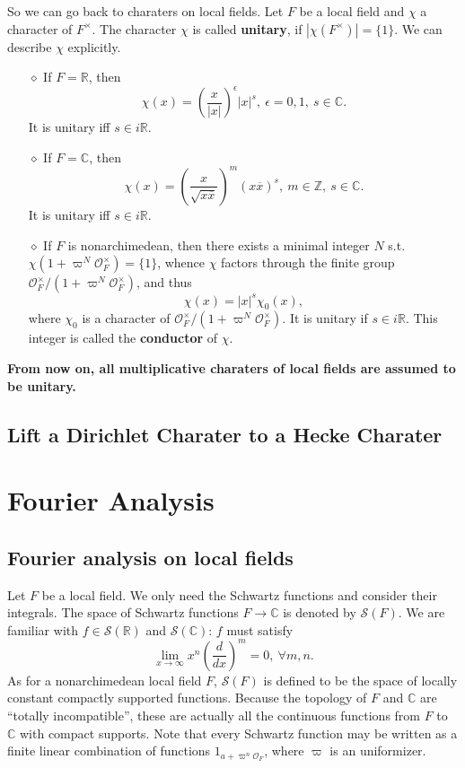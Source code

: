 \documentclass{article}
\theoremstyle{definition}
\theoremstyle{remark}
\renewcommand{\bar}{\overline}
\newcommand{\R}{\mathbb{R}}
\newcommand{\C}{\mathbb{C}}
\newcommand{\Z}{\mathbb{Z}}
\renewcommand{\O}{\mathcal{O}}
\newcommand{\myit}{$\diamond$}
\begin{document}
So we can go back to charaters on local fields. Let $F$ be a local field and $\chi$ a character of $F^{\times}$. The character $\chi$ is called \textbf{unitary}, if $|\chi(F^{\times})| = \{1\}$.
We can describe $\chi$ explicitly.
\begin{enumerate}
    \item [\myit] If $F = \R$, then \[\chi(x) = \left( \frac{x}{|x|} \right)^{\epsilon}|x|^s,\ \epsilon = 0, 1,\ s\in\C.\] It is unitary iff $s\in i\R$.
    \item [\myit] If $F = \C$, then \[\chi(x) = \left( \frac{x}{\sqrt{x\bar{x}}} \right)^m(x\bar{x})^s,\ m\in\Z,\ s\in\C.\] It is unitary iff $s\in i\R$.
    \item [\myit] If $F$ is nonarchimedean, then there exists a minimal integer $N$ s.t. $\chi(1 + \varpi^N\O_F^\times) = \{1\}$, whence $\chi$ factors through the finite group $\O_F^\times/(1 + \varpi^N\O_F^\times)$, and thus \[\chi(x) = |x|^s\chi_0(x),\] where $\chi_0$ is a character of $\O_F^\times/(1 + \varpi^N\O_F^\times)$.
    It is unitary if $s\in i\R$. 
    This integer is called the \textbf{conductor} of $\chi$. 
\end{enumerate}

\textbf{From now on, all multiplicative charaters of local fields are assumed to be unitary.}

\subsection{Lift a Dirichlet Charater to a Hecke Charater}


\section{Fourier Analysis}

\subsection{Fourier analysis on local fields}
Let $F$ be a local field. 
We only need the Schwartz functions and consider their integrals. The space of Schwartz functions $F \to\C$ is denoted by $\mathcal{S}(F)$.
We are familiar with $f\in \mathcal{S}(\R)$ and $\mathcal{S}(\C)$: $f$ must satisfy \[\lim_{x\to\infty}x^n \left( \frac{d}{dx} \right)^m = 0,\ \forall m, n.\]
As for a nonarchimedean local field $F$, $\mathcal{S}(F)$ is defined to be the space of locally constant compactly supported functions. Because the topology of $F$ and $\C$ are ``totally incompatible'', these are actually all the continuous functions from $F$ to $\C$ with compact supports.
Note that every Schwartz function may be written as a finite linear combination of functions $1_{a+\varpi^n\O_F}$, where $\varpi$ is an uniformizer.
\end{document}
